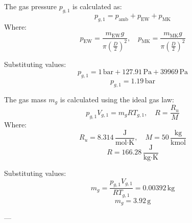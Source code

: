 The gas pressure \( p_{g,1} \) is calculated as:  
\[
p_{g,1} = p_{\text{amb}} + p_{\text{EW}} + p_{\text{MK}}
\]  
Where:  
\[
p_{\text{EW}} = \frac{m_{\text{EW}} g}{\pi \left(\frac{D}{2}\right)^2}, \quad p_{\text{MK}} = \frac{m_{\text{MK}} g}{\pi \left(\frac{D}{2}\right)^2}
\]  

Substituting values:  
\[
p_{g,1} = 1 \, \text{bar} + 127.91 \, \text{Pa} + 39969 \, \text{Pa}
\]  
\[
p_{g,1} = 1.19 \, \text{bar}
\]  

The gas mass \( m_g \) is calculated using the ideal gas law:  
\[
p_{g,1} V_{g,1} = m_g R T_{g,1}, \quad R = \frac{R_u}{M}
\]  
Where:  
\[
R_u = 8.314 \, \frac{\text{J}}{\text{mol·K}}, \quad M = 50 \, \frac{\text{kg}}{\text{kmol}}
\]  
\[
R = 166.28 \, \frac{\text{J}}{\text{kg·K}}
\]  

Substituting values:  
\[
m_g = \frac{p_{g,1} V_{g,1}}{R T_{g,1}} = 0.00392 \, \text{kg}
\]  
\[
m_g = 3.92 \, \text{g}
\]  

---